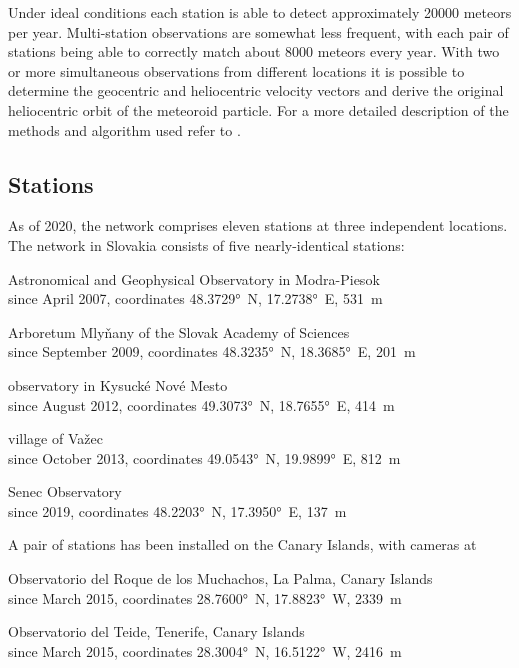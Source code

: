         Under ideal conditions each station is able to detect approximately 20000 meteors per year.
        Multi-station observations are somewhat less frequent, with each pair of stations being able
        to correctly match about 8000 meteors every year.
        With two or more simultaneous observations from different locations it is possible to determine
        the geocentric and heliocentric velocity vectors and derive the original heliocentric orbit of the meteoroid particle.
        For a more detailed description of the methods and algorithm used refer to \citet{fero?}.

    \subsection{Stations} \label{iAs}
        As of 2020, the network comprises eleven stations at three independent locations.
        The network in Slovakia consists of five nearly-identical stations:
        \begin{description}[leftmargin = 25mm]
            \item[AGO]      Astronomical and Geophysical Observatory in Modra-Piesok\\
                            since April 2007, coordinates \ang{48.3729}~N, \ang{17.2738}~E, \SI{531}{\metre}
            \item[ARBO]     Arboretum Mlyňany of the Slovak Academy of Sciences\\
                            since September 2009, coordinates \ang{48.3235}~N, \ang{18.3685}~E, \SI{201}{\metre}
            \item[KNM]      observatory in Kysucké Nové Mesto\\
                            since August 2012, coordinates \ang{49.3073}~N, \ang{18.7655}~E, \SI{414}{\metre}
            \item[VAZEC]    village of Važec\\
                            since October 2013, coordinates \ang{49.0543}~N, \ang{19.9899}~E, \SI{812}{\metre}
            \item[SENEC]    Senec Observatory\\
                            since 2019, coordinates \ang{48.2203}~N, \ang{17.3950}~E, \SI{137}{\metre} 
        \end{description}

        A pair of stations has been installed on the Canary Islands, with cameras at
        \begin{description}[leftmargin = 25mm]
            \item[LP]       Observatorio del Roque de los Muchachos, La Palma, Canary Islands\\
                            since March 2015, coordinates \ang{28.7600}~N, \ang{17.8823}~W, \SI{2339}{\metre}
            \item[TE]       Observatorio del Teide, Tenerife, Canary Islands\\
                            since March 2015, coordinates \ang{28.3004}~N, \ang{16.5122}~W, \SI{2416}{\metre}
        \end{description}

